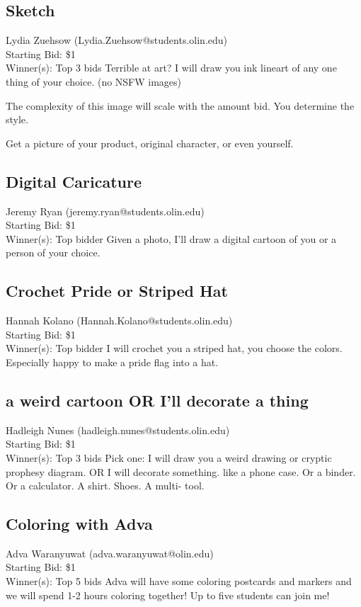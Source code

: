 \documentclass[11pt]{article}
\begin{document}
\subsection{Sketch}
Lydia Zuehsow (Lydia.Zuehsow@students.olin.edu) \\
Starting Bid: \$1 \\
Winner(s): 
Top 3 bids\newline
Terrible at art?
I will draw you ink lineart of any one thing of your choice.
(no NSFW images)

The complexity of this image will scale with the amount bid.
You determine the style.

Get a picture of your product, original character, or even yourself.
\subsection{Digital Caricature}
Jeremy Ryan (jeremy.ryan@students.olin.edu) \\
Starting Bid: \$1 \\
Winner(s): 
Top bidder\newline
Given a photo, I'll draw a digital cartoon of you or a person of your choice.
\subsection{Crochet Pride or Striped Hat}
Hannah Kolano (Hannah.Kolano@students.olin.edu) \\
Starting Bid: \$1 \\
Winner(s): 
Top bidder\newline
I will crochet you a striped hat, you choose the colors. Especially happy to make a pride flag into a hat.
\subsection{a weird cartoon OR I'll decorate a thing}
Hadleigh Nunes (hadleigh.nunes@students.olin.edu) \\
Starting Bid: \$1 \\
Winner(s): 
Top 3 bids\newline
Pick one: I will draw you a weird drawing or cryptic prophesy diagram. OR I will decorate something. like a phone case. Or a binder. Or a calculator. A shirt. Shoes. A multi- tool.
\subsection{Coloring with Adva}
Adva Waranyuwat (adva.waranyuwat@olin.edu) \\
Starting Bid: \$1 \\
Winner(s): 
Top 5 bids\newline
Adva will have some coloring postcards and markers and we will spend 1-2 hours coloring together!  Up to five students can join me!
\end{document}
